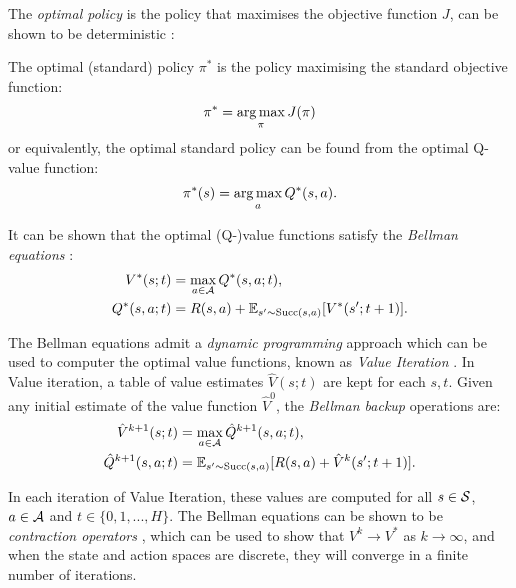     The \textit{optimal policy} is the policy that maximises the objective function $J$, can be shown to be deterministic  :
    \begin{defn}
        \label{def:opt_policy}
        The \textnormal{optimal (standard) policy} $\pi^*$ is the policy maximising the standard objective function:
        \begin{align}
            \pi^* = \operatorname*{arg\,max}_\pi J(\pi) \label{eq:opt_policy_def}
        \end{align}
        or equivalently, the optimal standard policy can be found from the optimal Q-value function:
        \begin{align}
            \pi^*(s) = \operatorname*{arg\,max}_a Q^*(s,a). \label{eq:opt_policy_from_opt_q_value}
        \end{align}
    \end{defn}


    It can be shown that the optimal (Q-)value functions satisfy the \textit{Bellman equations}  :
    \begin{align}
        V^*(s;t) &= \max_{a\in\mathcal{A}} Q^*(s,a;t), \label{eq:bellman_opt_v} \\
        Q^*(s,a;t) &= R(s,a) + \mathbb{E}_{s'\sim {\textnormal{Succ}(s,a)}} [V^*(s';t+1)]. \label{eq:bellman_opt_q}
    \end{align} 

    The Bellman equations admit a \textit{dynamic programming} approach which can be used to computer the optimal value functions, known as \textit{Value Iteration} . In Value iteration, a table of value estimates $\hat{V}(s;t)$ are kept for each $s,t$. Given any initial estimate of the value function $\hat{V}^{0}$, the \textit{Bellman backup} operations are:
    \begin{align}
        \hat{V}^{k+1}(s;t) &= \max_{a\in\mathcal{A}} \hat{Q}^{k+1}(s,a;t), \label{eq:value_iter_v_backup} \\
        \hat{Q}^{k+1}(s,a;t) &= \mathbb{E}_{s'\sim {\textnormal{Succ}(s,a)}} [R(s,a) + \hat{V}^k(s';t+1)]. \label{eq:value_iter_q_backup}
    \end{align}

    In each iteration of Value Iteration, these values are computed for all $s\in\mathcal{S}$, $a\in\mathcal{A}$ and $t\in\{0,1,...,H\}$. The Bellman equations can be shown to be \textit{contraction operators} , which can be used to show that $V^{k}\rightarrow V^*$ as $k\rightarrow \infty$, and when the state and action spaces are discrete, they will converge in a finite number of iterations. 





